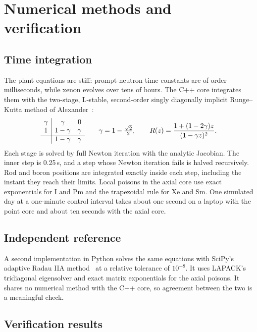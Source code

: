 \documentclass[11pt,a4paper]{article}
\begin{document}
\section{Numerical methods and verification}\label{sec:verification}

\subsection{Time integration}

The plant equations are stiff: prompt-neutron time constants are of order
milliseconds, while xenon evolves over tens of hours. The C++ core integrates them with
the two-stage, L-stable, second-order singly diagonally implicit Runge--Kutta method
of Alexander~\cite{alexander1977}:
\begin{equation}
  \begin{array}{c|cc}
    \gamma & \gamma & 0 \\
    1 & 1-\gamma & \gamma \\ \hline
      & 1-\gamma & \gamma
  \end{array}
  \qquad \gamma = 1 - \tfrac{\sqrt2}{2},
  \qquad R(z) = \frac{1 + (1 - 2\gamma)z}{(1 - \gamma z)^2}.
\end{equation}
Each stage is solved by full Newton iteration with the analytic Jacobian. The inner
step is 0.25\,s, and a step whose Newton iteration fails is halved recursively. Rod and
boron positions are integrated exactly inside each step, including the instant they
reach their limits. Local poisons in the axial core use exact exponentials for I and
Pm and the trapezoidal rule for Xe and Sm. One simulated day at a one-minute control
interval takes about one second on a laptop with the point core and about ten seconds
with the axial core.

\subsection{Independent reference}

A second implementation in Python solves the same equations with SciPy's adaptive
Radau IIA method~\cite{hairer1996,virtanen2020} at a relative tolerance of $10^{-8}$.
It uses LAPACK's tridiagonal eigensolver and exact matrix exponentials for the axial
poisons. It shares no numerical method with the C++ core, so agreement between the two
is a meaningful check.

\subsection{Verification results}
\end{document}
